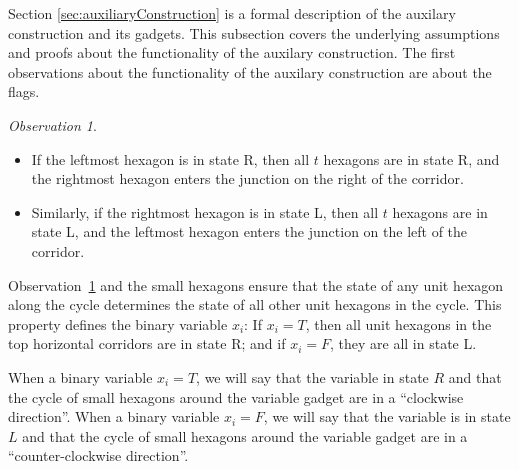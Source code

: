 \documentclass[10pt]{CSUNthesis}
\theoremstyle{plain}%
\theoremstyle{definition}
\theoremstyle{remark}
\newtheorem{observation}{Observation}
\begin{document}
Section \ref{sec:auxiliaryConstruction} is a formal description of the auxilary construction and its gadgets.
This subsection covers the underlying assumptions and proofs about the functionality of the auxilary construction.
The first observations about the functionality of the auxilary construction are about the flags.
\begin{observation}\label{obs:corridor}

\begin{itemize}

\item[(1)] If the leftmost hexagon is in state R, then all $t$ hexagons are in state R, and the rightmost hexagon enters the junction on the right of the corridor.
\item[(2)] Similarly, if the rightmost hexagon is in state L, then all $t$ hexagons are in state L, and the leftmost hexagon enters the junction on the left of the corridor.
\end{itemize}
\end{observation}

Observation~\ref{obs:corridor} and the small hexagons ensure that the state of any unit hexagon along the cycle determines the state of all other unit hexagons in the cycle. 
This property defines the binary variable $x_i$: If $x_i=T$, then all unit hexagons in the top horizontal corridors are in state R; and if $x_i=F$, they are all in state L.

When a binary variable $x_i = T$, we will say that the variable in state $R$ and that the cycle of small hexagons around the variable gadget are in a ``clockwise direction''.
When a binary variable $x_i = F$, we will say that the variable is in state $L$ and that the cycle of small hexagons around the variable gadget are in a ``counter-clockwise direction''. 
\end{document}
